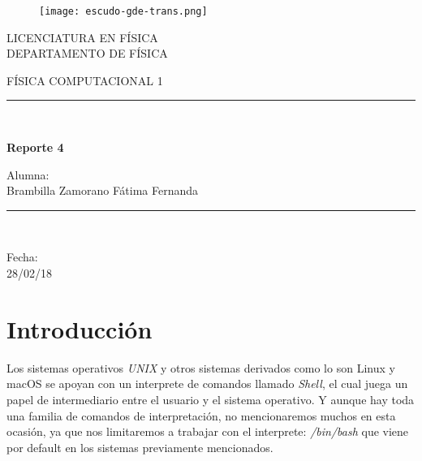 \documentclass{article}
\begin{document}
\begin{titlepage}

 \begin{center}
    \vspace*{-1in}
    \begin{figure}[htb]
    \begin{center}
    \texttt{[image: escudo-gde-trans.png]}
    \end{center}
    \end{figure}

\begin{center}
LICENCIATURA EN FÍSICA \\
\vspace*{0.15in}
DEPARTAMENTO DE FÍSICA \\
\vspace*{0.6in}
\begin{large}
FÍSICA COMPUTACIONAL 1 \\
\end{large}
\vspace*{0.2in}
\rule{80mm}{0.1mm}\\
\vspace*{0.1in}
\begin{large}
\textbf{Reporte 4\\ }
\end{large}
\vspace*{0.3in}
\begin{large}
Alumna: \\
\vspace*{0.1in}
Brambilla Zamorano Fátima Fernanda\\
\end{large}
\vspace*{0.3in}
\rule{80mm}{0.1mm}\\
\vspace*{0.1in}
\begin{large}
Fecha: \\ 28/02/18\\
\end{large}
\end{center}
\end{center}
\end{titlepage}

\section{Introducción}
Los sistemas operativos \textit{UNIX} y otros sistemas derivados como lo son Linux y macOS se apoyan con un interprete de comandos llamado \textit{Shell}, el cual juega un papel de intermediario entre el usuario y el sistema operativo. Y aunque hay toda una familia de comandos de interpretación, no mencionaremos muchos en esta ocasión, ya que nos limitaremos a trabajar con el interprete: \textit{/bin/bash} que viene por default en los sistemas previamente mencionados.
\end{document}
